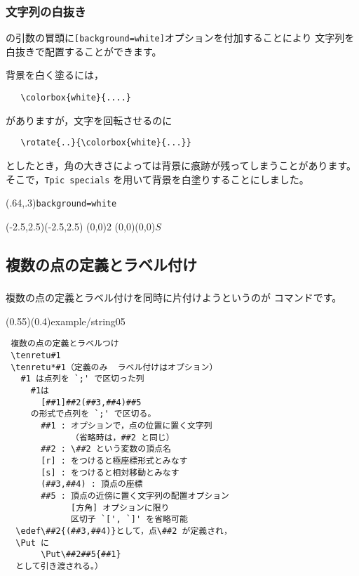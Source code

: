 \subsubsection{文字列の白抜き}
の引数の冒頭に\verb/[background=white]/オプションを付加することにより
文字列を白抜きで配置することができます。

背景を白く塗るには，
\begin{verbatim}
   \colorbox{white}{....}
\end{verbatim}
がありますが，文字を回転させるのに
\begin{verbatim}
   \rotate{..}{\colorbox{white}{...}}
\end{verbatim}
としたとき，角の大きさによっては背景に痕跡が残ってしまうことがあります。
そこで，\texttt{Tpic specials} を用いて背景を白塗りすることにしました。

\begin{showEx}(.64,.3){\texttt{background=white}}
\footnotesize
\drawaxisfalse
\begin{zahyou}(-2.5,2.5)(-2.5,2.5)
\def\O{(0,0)}
\En*\O{2}
\Put[background=white]\O(0,0){$S$}
\end{zahyou}
\end{showEx}
\fi



\subsection{複数の点の定義とラベル付け}
\subsubsection{\texorpdfstring{}{tenretu}}
複数の点の定義とラベル付けを同時に片付けようというのが
コマンドです。

(0.55)(0.4){example/string05}

\begin{boxnote}
\begin{verbatim}
 複数の点の定義とラベルつけ
 \tenretu#1
 \tenretu*#1（定義のみ  ラベル付けはオプション）
   #1 は点列を `;' で区切った列
     #1は
       [##1]##2(##3,##4)##5
     の形式で点列を `;' で区切る。
       ##1 : オプションで，点の位置に置く文字列
             （省略時は，##2 と同じ）
       ##2 : \##2 という変数の頂点名
       [r] : をつけると極座標形式とみなす
       [s] : をつけると相対移動とみなす
       (##3,##4) : 頂点の座標
       ##5 : 頂点の近傍に置く文字列の配置オプション
             [方角] オプションに限り
             区切子 `[', `]' を省略可能
  \edef\##2{(##3,##4)}として，点\##2 が定義され，
  \Put に
       \Put\##2##5{##1}
  として引き渡される。）
\end{verbatim}
\end{boxnote}

